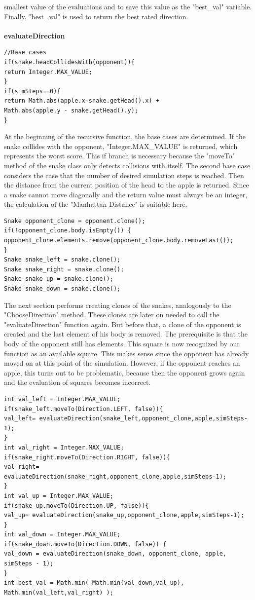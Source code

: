 \documentclass[a4paper,12pt]{article}
\begin{document}
smallest value of the evaluations and to save this value as the "best\_val" variable. Finally,
"best\_val" is used to return the best rated direction.
\\
\\\textbf{evaluateDirection}
\begin{verbatim}
//Base cases
if(snake.headCollidesWith(opponent)){
return Integer.MAX_VALUE;
}
if(simSteps==0){
return Math.abs(apple.x-snake.getHead().x) + 
Math.abs(apple.y - snake.getHead().y);
}
\end{verbatim}
At the beginning of the recursive function, the base cases are determined. If the snake collides with
the opponent, "Integer.MAX\_VALUE" is returned, which represents the worst score. This if branch is
necessary because the "moveTo" method of the snake class only detects collisions with itself.
The second base case considers the case that the number of desired simulation steps is reached.
Then the distance from the current position of the head to the apple is returned. Since a snake
cannot move diagonally and the return value must always be an integer, the calculation of the
"Manhattan Distance" is suitable here.\cite{manhatten}
\begin{verbatim}
Snake opponent_clone = opponent.clone();
if(!opponent_clone.body.isEmpty()) {
opponent_clone.elements.remove(opponent_clone.body.removeLast());
}
Snake snake_left = snake.clone();
Snake snake_right = snake.clone();
Snake snake_up = snake.clone();
Snake snake_down = snake.clone();
\end{verbatim}
The next section performs creating clones of the snakes, analogously to the "ChooseDirection"
method. These clones are later on needed to call the "evaluateDirection" function again. But before
that, a clone of the opponent is created and the last element of his body is removed. The prerequisite
is that the body of the opponent still has elements. This square is now recognized by our function as
an available square. This makes sense since the opponent has already moved on at this point of the
simulation. However, if the opponent reaches an apple, this turns out to be problematic, because
then the opponent grows again and the evaluation of squares becomes incorrect.
\begin{verbatim}
int val_left = Integer.MAX_VALUE;
if(snake_left.moveTo(Direction.LEFT, false)){
val_left= evaluateDirection(snake_left,opponent_clone,apple,simSteps-1);
}
int val_right = Integer.MAX_VALUE;
if(snake_right.moveTo(Direction.RIGHT, false)){
val_right= evaluateDirection(snake_right,opponent_clone,apple,simSteps-1);
}
int val_up = Integer.MAX_VALUE;
if(snake_up.moveTo(Direction.UP, false)){
val_up= evaluateDirection(snake_up,opponent_clone,apple,simSteps-1);
}
int val_down = Integer.MAX_VALUE;
if(snake_down.moveTo(Direction.DOWN, false)) {
val_down = evaluateDirection(snake_down, opponent_clone, apple, simSteps - 1);
}
int best_val = Math.min( Math.min(val_down,val_up),
Math.min(val_left,val_right) );
\end{verbatim}
\end{document}
